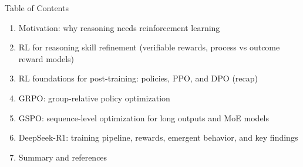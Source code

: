 \begin{frame}{Table of Contents}
  \begin{enumerate}\itemsep0.15em
    \item Motivation: why reasoning needs reinforcement learning
    \item RL for reasoning skill refinement (verifiable rewards, process vs outcome reward models)
    \item RL foundations for post-training: policies, PPO, and DPO (recap)
    \item GRPO: group-relative policy optimization
    \item GSPO: sequence-level optimization for long outputs and MoE models
    \item DeepSeek-R1: training pipeline, rewards, emergent behavior, and key findings
    \item Summary and references
  \end{enumerate}
\end{frame}
